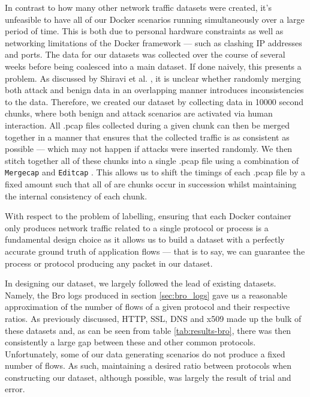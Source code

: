 \documentclass[msc,deptreport, cs]{infthesis} %
\begin{document}
In contrast to how many other network traffic datasets were created, it's unfeasible to have all of our Docker scenarios running simultaneously over a large period of time. This is both due to personal hardware constraints as well as networking limitations of the Docker framework --- such as clashing IP addresses and ports. The data for our datasets was collected over the course of several weeks before being coalesced into a main dataset. If done naively, this presents a problem. As discussed by Shiravi et al. \cite{shiravi2012toward}, it is unclear whether randomly merging both attack and benign data in an overlapping manner introduces inconsistencies to the data. Therefore, we created our dataset by collecting data in 10000 second chunks, where both benign and attack scenarios are activated via human interaction. All .pcap files collected during a given chunk can then be merged together in a manner that ensures that the collected traffic is as consistent as possible --- which may not happen if attacks were inserted randomly. We then stitch together all of these chunks into a single .pcap file using a combination of \texttt{Mergecap} \cite{mergecap} and \texttt{Editcap} \cite{editcap}. This allows us to shift the timings of each .pcap file by a fixed amount such that all of are chunks occur in succession whilst maintaining the internal consistency of each chunk.

With respect to the problem of labelling, ensuring that each Docker container only produces network traffic related to a single protocol or process is a fundamental design choice as it allows us to build a dataset with a perfectly accurate ground truth of application flows --- that is to say, we can guarantee the process or protocol producing any packet in our dataset. 

In designing our dataset, we largely followed the lead of existing datasets. Namely, the Bro logs produced in section \ref{sec:bro_logs} gave us a reasonable approximation of the number of flows of a given protocol and their respective ratios. As previously discussed, HTTP, SSL, DNS and x509 made up the bulk of these datasets and, as can be seen from table \ref{tab:results-bro}, there was then consistently a large gap between these and other common protocols. Unfortunately, some of our data generating scenarios do not produce a fixed number of flows. As such, maintaining a desired ratio between protocols when constructing our dataset, although possible, was largely the result of trial and error.
\end{document}
